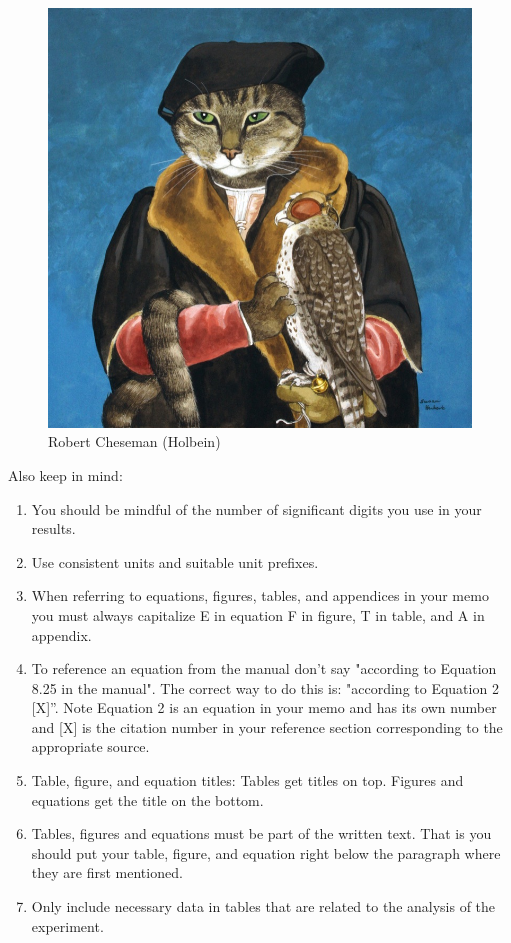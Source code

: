 \documentclass[11pt,letter]{report}
\begin{document}
\begin{figure}[H]
\centering
\includegraphics[scale=0.4]{cat-painting}%
\caption{Robert Cheseman (Holbein)\cite{Herbert}}
\label{fig:Cat Lord}
\end{figure}

Also keep in mind:

\begin{enumerate} %
  \item You should be mindful of the number of significant digits you use in your results.
  \item Use consistent units and suitable unit prefixes.
  \item When referring to equations, figures, tables, and appendices in your memo you must always capitalize E in equation F in figure, T in table, and A in appendix.
  \item To reference an equation from the manual don't say "according to Equation 8.25 in the manual". The correct way to do this is: "according to Equation 2 [X]”. Note Equation 2 is an equation in your memo and has its own number and [X] is the citation number in your reference section corresponding to the appropriate source.
  \item Table, figure, and equation titles: Tables get titles on top. Figures and equations get the title on the bottom.
  \item Tables, figures and equations must be part of the written text. That is you should put your table, figure, and equation right below the paragraph where they are first mentioned.
  \item Only include necessary data in tables that are related to the analysis of the experiment.
\end{enumerate}
\end{document}
